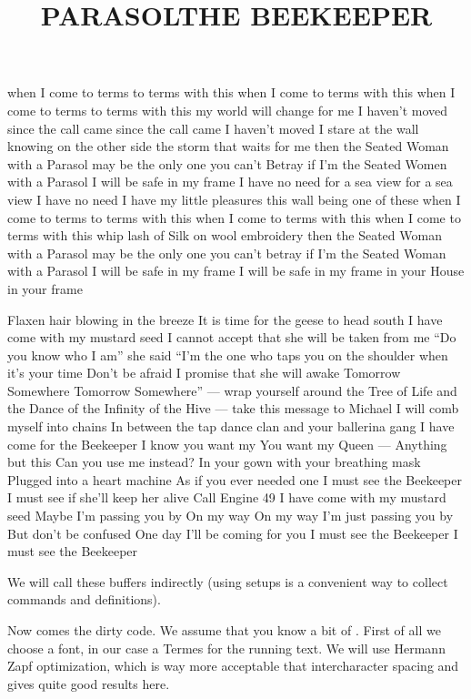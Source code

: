 \startbuffer
\startbuffer[parasol]
\title {PARASOL} when I come to
terms to terms with this when
I come to terms with this when I
come to terms to terms with this my
world will change for me I haven't moved
since the call came since the call came I
haven't moved I stare at the wall knowing on the
other side the storm that waits for me then the
Seated Woman with a Parasol may be the only one you
can't Betray if I'm the Seated Women with a Parasol I will
be safe in my frame I have no need for a sea view for a sea
view I have no need I have my little pleasures this wall
being one of these when I come to terms to terms
with this when I come to terms with this when I
come to terms with this whip lash of Silk on
wool embroidery then the Seated Woman
with a Parasol may be the only one you
can't betray if I'm the Seated Woman
with a Parasol I will be safe in my
frame I will be safe in my frame
in your House in your frame
\stopbuffer

\startbuffer[beekeeper]
\title {THE BEEKEEPER} Flaxen hair
blowing in the breeze It is time
for the geese to head south I have
come with my mustard seed I cannot
accept that she will be taken from me
``Do you know who I am'' she said ``I'm the
one who taps you on the shoulder when it's
your time Don't be afraid I promise that she
will awake Tomorrow Somewhere Tomorrow
Somewhere'' --- wrap yourself around the Tree of
Life and the Dance of the Infinity of the Hive --- take
this message to Michael I will comb myself into chains In
between the tap dance clan and your ballerina gang I have
come for the Beekeeper I know you want my You want
my Queen --- Anything but this Can you use me instead?
In your gown with your breathing mask Plugged into
a heart machine As if you ever needed one I must
see the Beekeeper I must see if she'll keep her
alive Call Engine 49 I have come with my
mustard seed Maybe I'm passing you by
On my way On my way I'm just passing
you by But don't be confused
One day I'll be coming for you \unknown\space
I must see the Beekeeper
I must see the Beekeeper
\stopbuffer
\stopbuffer

\typebuffer \getbuffer

We will call these buffers indirectly (using setups is a convenient way to
collect commands and definitions).

\startbuffer
\startsetups [beetext]
  \getbuffer[parasol]
\stopsetups
\stopbuffer

\typebuffer \getbuffer

Now comes the dirty code. We assume that you know a bit of \CONTEXT. First of all
we choose a font, in our case a Termes for the running text. We will use
Hermann Zapf optimization, which is way more acceptable that intercharacter
spacing and gives quite good results here.

